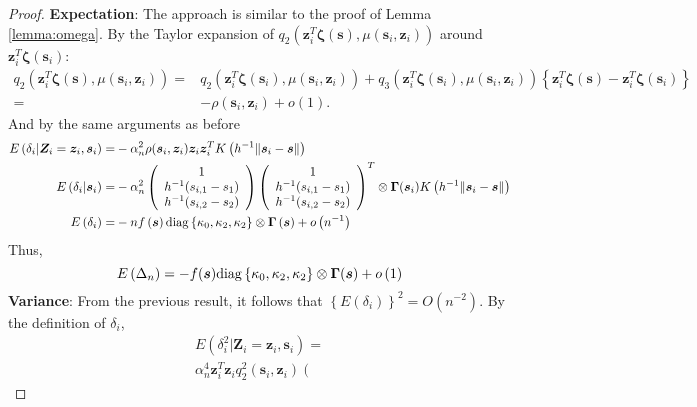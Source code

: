 \documentclass[authoryear,review, 12pt]{elsarticle}
\begin{document}
\begin{proof}
\textbf{Expectation}: The approach is similar to the proof of Lemma
\ref{lemma:omega}. By the Taylor expansion of $q_{2}\left(\bm{z}_{i}^{T}\bm{\zeta}(\bm{s}),\mu\left(\bm{s}_{i},\bm{z}_{i}\right)\right)$
around $\bm{z}_{i}^{T}\bm{\zeta}(\bm{s}_{i})$:
\begin{align*}
q_{2}\left(\bm{z}_{i}^{T}\bm{\zeta}(\bm{s}),\mu(\bm{s}_{i},\bm{z}_{i})\right)= & q_{2}\left(\bm{z}_{i}^{T}\bm{\zeta}(\bm{s}_{i}),\mu(\bm{s}_{i},\bm{z}_{i})\right)+q_{3}\left(\bm{z}_{i}^{T}\bm{\zeta}(\bm{s}_{i}),\mu(\bm{s}_{i},\bm{z}_{i})\right)\left\{ \bm{z}_{i}^{T}\bm{\zeta}(\bm{s})-\bm{z}_{i}^{T}\bm{\zeta}(\bm{s}_{i})\right\} \\
= & -\rho(\bm{s}_{i},\bm{z}_{i})+o\left(1\right).
\end{align*}
And by the same arguments as before
\begin{align*}
E\left(\delta_{i}|\bm{Z}_{i}=\bm{z}_{i},\bm{s}_{i}\right)= & -\alpha_{n}^{2}\rho(\bm{s}_{i},\bm{z}_{i})\bm{z}_{i}\bm{z}_{i}^{T}K\left(h^{-1}\|\bm{s}_{i}-\bm{s}\|\right)\\
E\left(\delta_{i}|\bm{s}_{i}\right)= & -\alpha_{n}^{2}\left(\begin{array}{c}
1\\
h^{-1}(s_{i,1}-s_{1})\\
h^{-1}(s_{i,2}-s_{2})
\end{array}\right)\left(\begin{array}{c}
1\\
h^{-1}(s_{i,1}-s_{1})\\
h^{-1}(s_{i,2}-s_{2})
\end{array}\right)^{T}\otimes\bm{\Gamma}(\bm{s}_{i})K\left(h^{-1}\|\bm{s}_{i}-\bm{s}\|\right)\\
E\left(\delta_{i}\right)= & -nf\left(\bm{s}\right){\rm diag}\left\{ \kappa_{0},\kappa_{2},\kappa_{2}\right\} \otimes\bm{\Gamma}\left(\bm{s}\right)+o\left(n^{-1}\right)
\end{align*}
Thus, 
\[
E\left(\Delta_{n}\right)=-f(\bm{s}){\rm diag}\left\{ \kappa_{0},\kappa_{2},\kappa_{2}\right\} \otimes\bm{\Gamma}(\bm{s})+o\left(1\right)
\]
\textbf{Variance}: From the previous result, it follows that $\left\{ E\left(\delta_{i}\right)\right\} ^{2}=O\left(n^{-2}\right)$.
By the definition of $\delta_{i}$,
\begin{multline*}
E\left(\delta_{i}^{2}|\bm{Z}_{i}=\bm{z}_{i},\bm{s}_{i}\right)=\\
\alpha_{n}^{4}\bm{z}_{i}^{T}\bm{z}_{i}q_{2}^{2}(\bm{s}_{i},\bm{z}_{i})\left(\begin{array}{c}

\end{array}
\end{multline*}
\end{proof}
\end{document}
